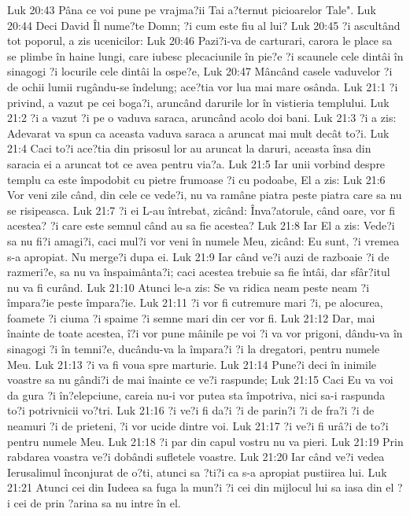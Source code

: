Luk 20:43  Pâna ce voi pune pe vrajma?ii Tai a?ternut picioarelor Tale".
Luk 20:44  Deci David Îl nume?te Domn; ?i cum este fiu al lui?
Luk 20:45  ?i ascultând tot poporul, a zis ucenicilor:
Luk 20:46  Pazi?i-va de carturari, carora le place sa se plimbe în haine lungi, care iubesc plecaciunile în pie?e ?i scaunele cele dintâi în sinagogi ?i locurile cele dintâi la ospe?e,
Luk 20:47  Mâncând casele vaduvelor ?i de ochii lumii rugându-se îndelung; ace?tia vor lua mai mare osânda.
Luk 21:1  ?i privind, a vazut pe cei boga?i, aruncând darurile lor în vistieria templului.
Luk 21:2  ?i a vazut ?i pe o vaduva saraca, aruncând acolo doi bani.
Luk 21:3  ?i a zis: Adevarat va spun ca aceasta vaduva saraca a aruncat mai mult decât to?i.
Luk 21:4  Caci to?i ace?tia din prisosul lor au aruncat la daruri, aceasta însa din saracia ei a aruncat tot ce avea pentru via?a.
Luk 21:5  Iar unii vorbind despre templu ca este împodobit cu pietre frumoase ?i cu podoabe, El a zis:
Luk 21:6  Vor veni zile când, din cele ce vede?i, nu va ramâne piatra peste piatra care sa nu se risipeasca.
Luk 21:7  ?i ei L-au întrebat, zicând: Înva?atorule, când oare, vor fi acestea? ?i care este semnul când au sa fie acestea?
Luk 21:8  Iar El a zis: Vede?i sa nu fi?i amagi?i, caci mul?i vor veni în numele Meu, zicând: Eu sunt, ?i vremea s-a apropiat. Nu merge?i dupa ei.
Luk 21:9  Iar când ve?i auzi de razboaie ?i de razmeri?e, sa nu va înspaimânta?i; caci acestea trebuie sa fie întâi, dar sfâr?itul nu va fi curând.
Luk 21:10  Atunci le-a zis: Se va ridica neam peste neam ?i împara?ie peste împara?ie.
Luk 21:11  ?i vor fi cutremure mari ?i, pe alocurea, foamete ?i ciuma ?i spaime ?i semne mari din cer vor fi.
Luk 21:12  Dar, mai înainte de toate acestea, î?i vor pune mâinile pe voi ?i va vor prigoni, dându-va în sinagogi ?i în temni?e, ducându-va la împara?i ?i la dregatori, pentru numele Meu.
Luk 21:13  ?i va fi voua spre marturie.
Luk 21:14  Pune?i deci în inimile voastre sa nu gândi?i de mai înainte ce ve?i raspunde;
Luk 21:15  Caci Eu va voi da gura ?i în?elepciune, careia nu-i vor putea sta împotriva, nici sa-i raspunda to?i potrivnicii vo?tri.
Luk 21:16  ?i ve?i fi da?i ?i de parin?i ?i de fra?i ?i de neamuri ?i de prieteni, ?i vor ucide dintre voi.
Luk 21:17  ?i ve?i fi urâ?i de to?i pentru numele Meu.
Luk 21:18  ?i par din capul vostru nu va pieri.
Luk 21:19  Prin rabdarea voastra ve?i dobândi sufletele voastre.
Luk 21:20  Iar când ve?i vedea Ierusalimul înconjurat de o?ti, atunci sa ?ti?i ca s-a apropiat pustiirea lui.
Luk 21:21  Atunci cei din Iudeea sa fuga la mun?i ?i cei din mijlocul lui sa iasa din el ?i cei de prin ?arina sa nu intre în el.

